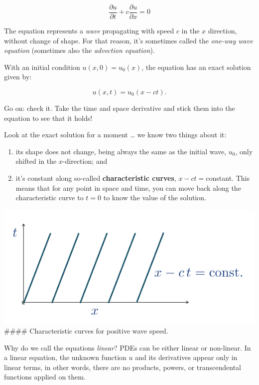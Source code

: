 \documentclass{article}
\providecommand{\tightlist}{%
      \setlength{\itemsep}{0pt}\setlength{\parskip}{0pt}}
\begin{document}
\begin{equation}\frac{\partial u}{\partial t} + c \frac{\partial u}{\partial x} = 0\end{equation}

The equation represents a \emph{wave} propagating with speed \(c\) in
the \(x\) direction, without change of shape. For that reason, it's
sometimes called the \emph{one-way wave equation} (sometimes also the
\emph{advection equation}).

With an initial condition \(u(x,0)=u_0(x)\), the equation has an exact
solution given by:

\begin{equation}u(x,t)=u_0(x-ct). 
\end{equation}

Go on: check it. Take the time and space derivative and stick them into
the equation to see that it holds!

Look at the exact solution for a moment \ldots{} we know two things
about it:

\begin{enumerate}
\def\labelenumi{\arabic{enumi}.}
\tightlist
\item
  its shape does not change, being always the same as the initial wave,
  \(u_0\), only shifted in the \(x\)-direction; and
\item
  it's constant along so-called \textbf{characteristic curves},
  \(x-ct=\)constant. This means that for any point in space and time,
  you can move back along the characteristic curve to \(t=0\) to know
  the value of the solution.
\end{enumerate}

    \includegraphics{figures/characteristics.png} \#\#\#\# Characteristic
curves for positive wave speed.

    Why do we call the equations \emph{linear}? PDEs can be either linear or
non-linear. In a linear equation, the unknown function \(u\) and its
derivatives appear only in linear terms, in other words, there are no
products, powers, or transcendental functions applied on them.
\end{document}
